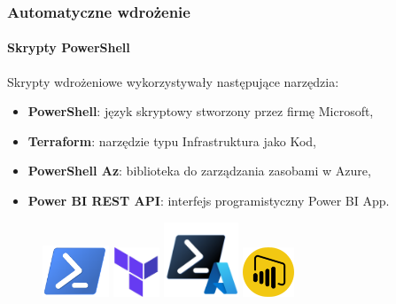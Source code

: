 \documentclass[10pt]{beamer}
\begin{document}
\begin{frame}
	\frametitle{Automatyczne wdrożenie}
	\framesubtitle{Skrypty PowerShell}
	
Skrypty wdrożeniowe wykorzystywały następujące narzędzia:

\bigskip

\begin{itemize}
	\item \textbf{PowerShell}: język skryptowy stworzony przez firmę Microsoft,
	\item \textbf{Terraform}: narzędzie typu Infrastruktura jako Kod,
	\item \textbf{PowerShell Az}: biblioteka do zarządzania zasobami w Azure,
	\item \textbf{Power BI REST API}: interfejs programistyczny Power BI App.
\end{itemize}

\bigskip

\begin{figure}
	\centering
	\begin{minipage}{.15\linewidth}
		\centering
		\includegraphics[height=4.1em]{./images/powershell.png}
	\end{minipage}\hfill
	\begin{minipage}{.15\linewidth}
		\centering
		\includegraphics[height=4em]{./images/terraform.png}
	\end{minipage}\hfill
	\begin{minipage}{.15\linewidth}
		\centering
		\includegraphics[height=6em]{./images/powershell-az.png}
	\end{minipage}\hfill
	\begin{minipage}{.15\linewidth}
		\centering
		\includegraphics[height=4em]{./images/power-bi-rest-api.png}
	\end{minipage}
\end{figure}

\end{frame}
\end{document}
